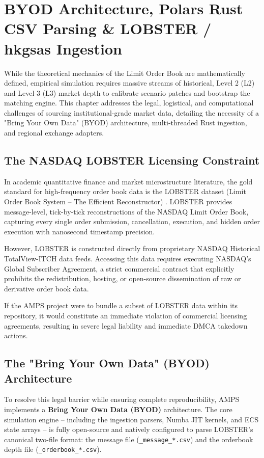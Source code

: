 \chapter{BYOD Architecture, Polars Rust CSV Parsing \& LOBSTER / hkgsas Ingestion}
\label{ch:byod_architecture}

While the theoretical mechanics of the Limit Order Book are mathematically defined, empirical simulation requires massive streams of historical, Level 2 (L2) and Level 3 (L3) market depth to calibrate scenario patches and bootstrap the matching engine. This chapter addresses the legal, logistical, and computational challenges of sourcing institutional-grade market data, detailing the necessity of a "Bring Your Own Data" (BYOD) architecture, multi-threaded Rust ingestion, and regional exchange adapters.

\section{The NASDAQ LOBSTER Licensing Constraint}

In academic quantitative finance and market microstructure literature, the gold standard for high-frequency order book data is the LOBSTER dataset (Limit Order Book System -- The Efficient Reconstructor) \cite{huang2011lobster}. LOBSTER provides message-level, tick-by-tick reconstructions of the NASDAQ Limit Order Book, capturing every single order submission, cancellation, execution, and hidden order execution with nanosecond timestamp precision.

However, LOBSTER is constructed directly from proprietary NASDAQ Historical TotalView\allowbreak-ITCH data feeds. Accessing this data requires executing NASDAQ's Global Subscriber Agreement, a strict commercial contract that explicitly prohibits the redistribution, hosting, or open-source dissemination of raw or derivative order book data. 

If the AMPS project were to bundle a subset of LOBSTER data within its repository, it would constitute an immediate violation of commercial licensing agreements, resulting in severe legal liability and immediate DMCA takedown actions.

\section{The "Bring Your Own Data" (BYOD) Architecture}

To resolve this legal barrier while ensuring complete reproducibility, AMPS implements a \textbf{Bring Your Own Data (BYOD)} architecture. The core simulation engine -- including the ingestion parsers, Numba JIT kernels, and ECS state arrays -- is fully open-source and natively configured to parse LOBSTER's canonical two-file format: the message file (\texttt{\_message\_*.csv}) and the orderbook depth file (\texttt{\_orderbook\_*.csv}).

